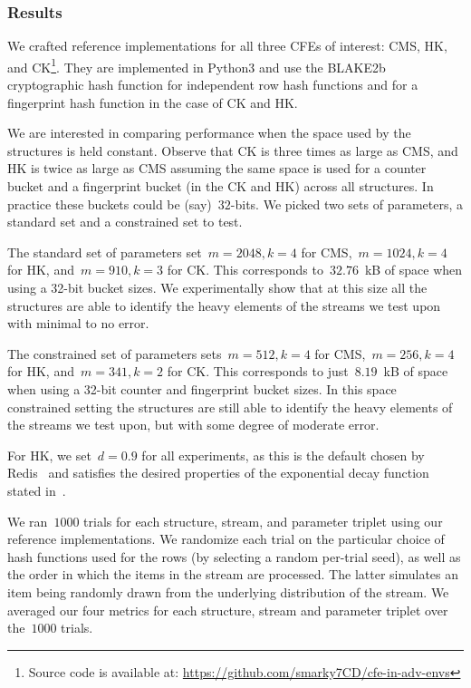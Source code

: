 \subsubsection{Results} We crafted reference implementations for all three CFEs of interest: CMS, HK, and CK\footnote{Source code is available at: \url{https://github.com/smarky7CD/cfe-in-adv-envs}}. They are implemented in Python3 and use the BLAKE2b cryptographic hash function %
for independent row hash functions and for a fingerprint hash function in the case of CK and HK. %

We are interested in comparing performance when the space used by the structures is held constant. Observe that CK is three times as large as  CMS, and HK is twice as large as CMS assuming the same space is used for a counter bucket and a fingerprint bucket (in the CK and HK) across all structures. In practice these buckets could be (say)~$32$-bits. We picked two sets of parameters, a standard set and a constrained set to test.

The standard set of parameters set~$m=2048,k=4$ for CMS,~$m=1024,k=4$ for HK, and~$m=910,k=3$ for CK. This corresponds to~$32.76$~kB of space when using a 32-bit bucket sizes. We experimentally show that at this size all the structures are able to identify the heavy elements of the streams we test upon with minimal to no error. 

The constrained set of parameters sets~$m=512,k=4$ for CMS,~$m=256,k=4$ for HK, and~$m=341,k=2$ for CK. This corresponds to just~$8.19$~kB of space when using a 32-bit counter and fingerprint bucket sizes. In this space constrained setting the structures are still able to identify the heavy elements of the streams we test upon, but with some degree of moderate error. 

For HK, we set~$d=0.9$ for all experiments, as this is the default chosen by Redis~\cite{redisbloom} and satisfies the desired properties of the exponential decay function stated in~\cite{yang2019heavykeeper}. 

We ran~$1000$ trials for each structure, stream, and parameter triplet using our reference implementations. We randomize each trial on the particular choice of hash functions used for the rows (by selecting a random per-trial seed), as well as the order in which the items in the stream are processed. The latter simulates an item being randomly drawn from the underlying distribution of the stream. We averaged our four metrics for each structure, stream and parameter triplet over the~$1000$ trials. 

